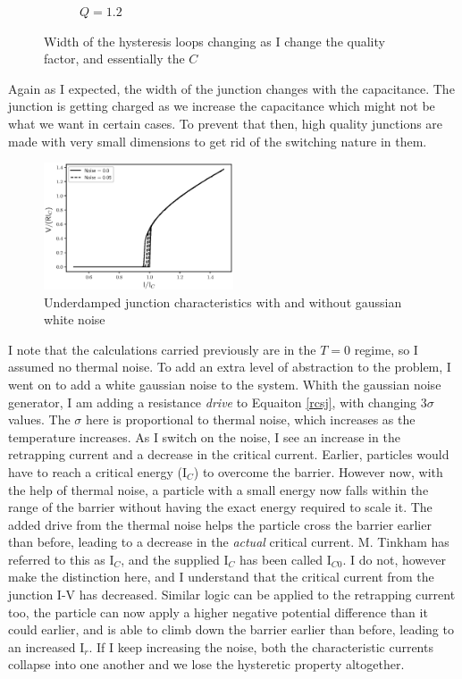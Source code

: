 \documentclass{thesis}
\begin{document}
\begin{figure}[H]
\begin{subfigure}[b]{0.32\textwidth}
        \caption{$Q=1.2$}
    \end{subfigure}
    \caption{Width of the hysteresis loops changing as I change the quality factor, and essentially the $C$}
    \label{Qchange}
\end{figure}

Again as I expected, the width of the junction changes with the capacitance. The junction is getting charged as we increase the capacitance which might not be what we want in certain cases. To prevent that then, high quality junctions are made with very small dimensions to get rid of the switching nature in them.

\begin{figure}[H]
    \centering
    \includegraphics[width=0.5\textwidth]{images/Q_1.eps}
    \caption{Underdamped junction characteristics with and without gaussian white noise}
    \label{noisyunder}
\end{figure}

I note that the calculations carried previously are in the $T=0$ regime, so I assumed no thermal noise. To add an extra level of abstraction to the problem, I went on to add a white gaussian noise to the system. Whith the gaussian noise generator, I am adding a resistance \textit{drive} to Equaiton \ref{rcsj}, with changing $3\sigma$ values. The $\sigma$ here is proportional to thermal noise, which increases as the temperature increases. As I switch on the noise, I see an increase in the retrapping current and a decrease in the critical current. Earlier, particles would have to reach a critical energy (I$_C$) to overcome the barrier. However now, with the help of thermal noise, a particle with a small energy now falls within the range of the barrier without having the exact energy required to scale it. The added drive from the thermal noise helps the particle cross the barrier earlier than before, leading to a decrease in the \textit{actual} critical current. M. Tinkham has referred to this as I$_C$, and the supplied I$_C$ has been called I$_{C0}$. I do not, however make the distinction here, and I understand that the critical current from the junction I-V has decreased. Similar logic can be applied to the retrapping current too, the particle can now apply a higher negative potential difference than it could earlier, and is able to climb down the barrier earlier than before, leading to an increased I$_r$. If I keep increasing the noise, both the characteristic currents collapse into one another and we lose the hysteretic property altogether.
\end{document}
